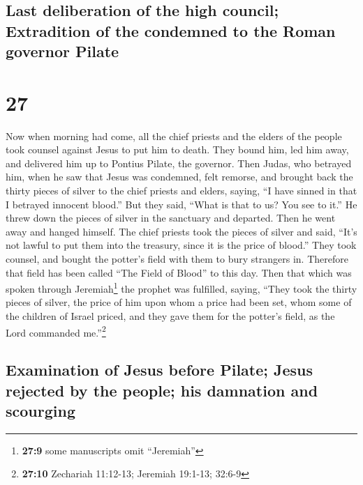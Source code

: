 \hypertarget{last-deliberation-of-the-high-council-extradition-of-the-condemned-to-the-roman-governor-pilate}{%
\subsection{Last deliberation of the high council; Extradition of the
condemned to the Roman governor
Pilate}\label{last-deliberation-of-the-high-council-extradition-of-the-condemned-to-the-roman-governor-pilate}}

\hypertarget{section-26}{%
\section{27}\label{section-26}}

 Now when morning had come, all the chief priests and the
elders of the people took counsel against Jesus to put him to death.
 They bound him, led him away, and delivered him up to
Pontius Pilate, the governor.  Then Judas, who betrayed
him, when he saw that Jesus was condemned, felt remorse, and brought
back the thirty pieces of silver to the chief priests and elders,
 saying, ``I have sinned in that I betrayed innocent
blood.'' But they said, ``What is that to us? You see to it.''
 He threw down the pieces of silver in the sanctuary and
departed. Then he went away and hanged himself.  The chief
priests took the pieces of silver and said, ``It's not lawful to put
them into the treasury, since it is the price of blood.'' 
They took counsel, and bought the potter's field with them to bury
strangers in.  Therefore that field has been called ``The
Field of Blood'' to this day.  Then that which was spoken
through Jeremiah\footnote{\textbf{27:9} some manuscripts omit
  ``Jeremiah''} the prophet was fulfilled, saying, ``They took the
thirty pieces of silver, the price of him upon whom a price had been
set, whom some of the children of Israel priced,  and
they gave them for the potter's field, as the Lord commanded
me.''\footnote{\textbf{27:10} Zechariah 11:12-13; Jeremiah 19:1-13;
  32:6-9}

\hypertarget{examination-of-jesus-before-pilate-jesus-rejected-by-the-people-his-damnation-and-scourging}{%
\subsection{Examination of Jesus before Pilate; Jesus rejected by the
people; his damnation and
scourging}\label{examination-of-jesus-before-pilate-jesus-rejected-by-the-people-his-damnation-and-scourging}}

